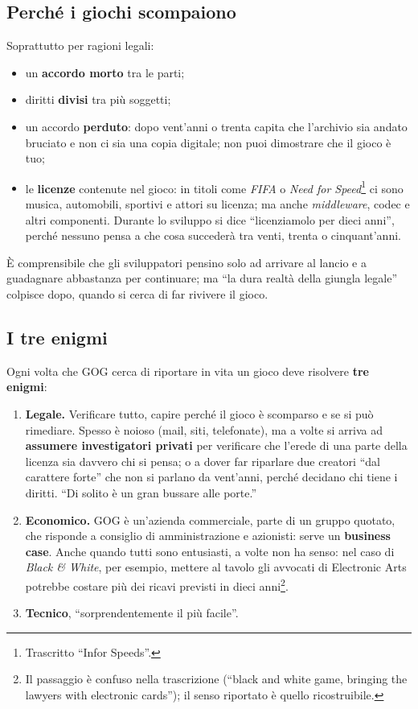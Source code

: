 \subsection{Perché i giochi scompaiono}

Soprattutto per ragioni legali:
\begin{itemize}
  \item un \textbf{accordo morto} tra le parti;
  \item diritti \textbf{divisi} tra più soggetti;
  \item un accordo \textbf{perduto}: dopo vent'anni o trenta capita che
        l'archivio sia andato bruciato e non ci sia una copia digitale; non puoi
        dimostrare che il gioco è tuo;
  \item le \textbf{licenze} contenute nel gioco: in titoli come \emph{FIFA} o
        \emph{Need for Speed}\footnote{Trascritto ``Infor Speeds''.} ci sono
        musica, automobili, sportivi e attori su licenza; ma anche
        \emph{middleware}, codec e altri componenti. Durante lo sviluppo si dice
        ``licenziamolo per dieci anni'', perché nessuno pensa a che cosa
        succederà tra venti, trenta o cinquant'anni.
\end{itemize}
È comprensibile che gli sviluppatori pensino solo ad arrivare al lancio e a
guadagnare abbastanza per continuare; ma ``la dura realtà della giungla legale''
colpisce dopo, quando si cerca di far rivivere il gioco.

\subsection{I tre enigmi}

Ogni volta che GOG cerca di riportare in vita un gioco deve risolvere
\textbf{tre enigmi}:
\begin{enumerate}
  \item \textbf{Legale.} Verificare tutto, capire perché il gioco è scomparso e
        se si può rimediare. Spesso è noioso (mail, siti, telefonate), ma a volte
        si arriva ad \textbf{assumere investigatori privati} per verificare che
        l'erede di una parte della licenza sia davvero chi si pensa; o a dover
        far riparlare due creatori ``dal carattere forte'' che non si parlano da
        vent'anni, perché decidano chi tiene i diritti. ``Di solito è un gran
        bussare alle porte.''
  \item \textbf{Economico.} GOG è un'azienda commerciale, parte di un gruppo
        quotato, che risponde a consiglio di amministrazione e azionisti: serve un
        \textbf{business case}. Anche quando tutti sono entusiasti, a volte non ha
        senso: nel caso di \emph{Black \& White}, per esempio, mettere al tavolo
        gli avvocati di Electronic Arts potrebbe costare più dei ricavi previsti
        in dieci anni\footnote{Il passaggio è confuso nella trascrizione (``black
        and white game, bringing the lawyers with electronic cards''); il senso
        riportato è quello ricostruibile.}.
  \item \textbf{Tecnico}, ``sorprendentemente il più facile''.
\end{enumerate}

